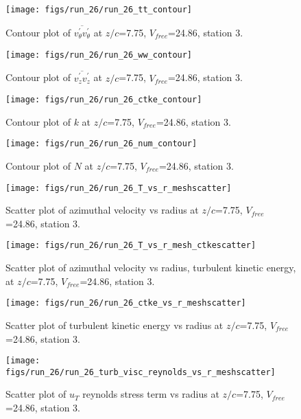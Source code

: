 \begin{figure}[H]
\centering
\texttt{[image: figs/run\_26/run\_26\_tt\_contour]}
\caption{Contour plot of $\overline{v_{\theta}^{\prime} v_{\theta}^{\prime}}$ at $z/c$=7.75, $V_{free}$=24.86, station 3.}
\end{figure}


\begin{figure}[H]
\centering
\texttt{[image: figs/run\_26/run\_26\_ww\_contour]}
\caption{Contour plot of $\overline{v_{z}^{\prime} v_{z}^{\prime}}$ at $z/c$=7.75, $V_{free}$=24.86, station 3.}
\end{figure}


\begin{figure}[H]
\centering
\texttt{[image: figs/run\_26/run\_26\_ctke\_contour]}
\caption{Contour plot of $k$ at $z/c$=7.75, $V_{free}$=24.86, station 3.}
\end{figure}


\begin{figure}[H]
\centering
\texttt{[image: figs/run\_26/run\_26\_num\_contour]}
\caption{Contour plot of $N$ at $z/c$=7.75, $V_{free}$=24.86, station 3.}
\end{figure}


\begin{figure}[H]
\centering
\texttt{[image: figs/run\_26/run\_26\_T\_vs\_r\_meshscatter]}
\caption{Scatter plot of azimuthal velocity vs radius at $z/c$=7.75, $V_{free}$=24.86, station 3.}
\end{figure}


\begin{figure}[H]
\centering
\texttt{[image: figs/run\_26/run\_26\_T\_vs\_r\_mesh\_ctkescatter]}
\caption{Scatter plot of azimuthal velocity vs radius, turbulent kinetic energy, at $z/c$=7.75, $V_{free}$=24.86, station 3.}
\end{figure}


\begin{figure}[H]
\centering
\texttt{[image: figs/run\_26/run\_26\_ctke\_vs\_r\_meshscatter]}
\caption{Scatter plot of turbulent kinetic energy vs radius at $z/c$=7.75, $V_{free}$=24.86, station 3.}
\end{figure}


\begin{figure}[H]
\centering
\texttt{[image: figs/run\_26/run\_26\_turb\_visc\_reynolds\_vs\_r\_meshscatter]}
\caption{Scatter plot of $
u_T$ reynolds stress term vs radius at $z/c$=7.75, $V_{free}$=24.86, station 3.}
\end{figure}


